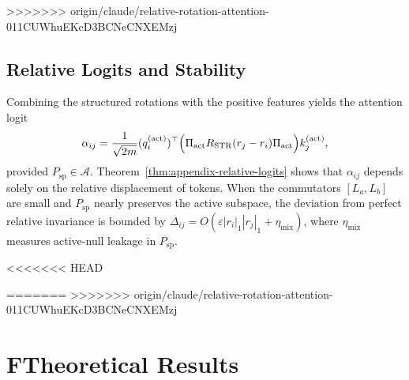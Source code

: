\documentclass[11pt]{article}
\begin{document}
>>>>>>> origin/claude/relative-rotation-attention-011CUWhuEKcD3BCNeCNXEMzj
\subsection{Relative Logits and Stability}

Combining the structured rotations with the positive features yields the attention logit
\[
\alpha_{ij}
= \frac{1}{\sqrt{2m}} (q_i^{(\mathrm{act})})^\top
  \Bigl(\Pi_{\mathrm{act}} R_{\mathrm{STR}}(r_j - r_i) \Pi_{\mathrm{act}}\Bigr)
  k_j^{(\mathrm{act})},
\]
provided $P_{\mathrm{sp}}\in\mathcal{A}$. Theorem~\ref{thm:appendix-relative-logits} shows that $\alpha_{ij}$ depends solely on the
relative displacement of tokens. When the commutators $[L_a,L_b]$ are small and
$P_{\mathrm{sp}}$ nearly preserves the active subspace, the deviation from perfect relative invariance is
bounded by $\Delta_{ij} = O(\varepsilon |r_i|_1 |r_j|_1 + \eta_{\mathrm{mix}})$, where $\eta_{\mathrm{mix}}$ measures
active-null leakage in $P_{\mathrm{sp}}$.

<<<<<<< HEAD



=======
>>>>>>> origin/claude/relative-rotation-attention-011CUWhuEKcD3BCNeCNXEMzj

\clearpage
\appendix
\section*{F\quad Theoretical Results}
\label{sec:appendix-theory}
\end{document}
